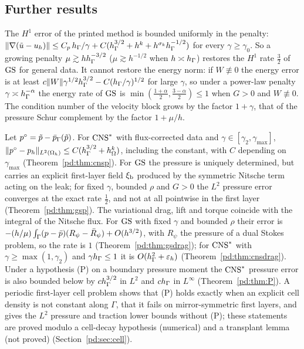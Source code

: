 \subsection*{Further results}
\begin{theoremR}
The $H^1$ error of the printed method is bounded uniformly in the penalty: $\lVert \nabla(\tilde u-u_h)\rVert\le C_p\,h_\Gamma/\gamma+C(h_\Gamma^{3/2}+h^k+h^{\sigma_k}h_\Gamma^{-1/2})$ for every $\gamma\ge\gamma_0$. So a growing penalty $\mu\gtrsim hh_\Gamma^{-3/2}$ ($\mu\gtrsim h^{-1/2}$ when $h\asymp h_\Gamma$) restores the $H^1$ rate $\frac32$ of $\mathrm{GS}$ for general data. It cannot restore the energy norm: if $W\not\equiv0$ the energy error is at least $c\lVert W\rVert\gamma^{1/2}h_\Gamma^{3/2}-C(h_\Gamma/\gamma)^{1/2}$ for large $\gamma$, so under a power-law penalty $\gamma\asymp h_\Gamma^{-\alpha}$ the energy rate of $\mathrm{GS}$ is $\min(\frac{1+\alpha}2,\frac{3-\alpha}2)\le1$ when $G>0$ and $W\not\equiv0$. The condition number of the velocity block grows by the factor $1+\gamma$, that of the pressure Schur complement by the factor $1+\mu/h$.
\end{theoremR}

\begin{theoremP}
Let $p^\circ=\tilde p-\bar p_{\Gamma}(\tilde p)$. For $\mathrm{CNS}^\ast$ with flux-corrected data and $\gamma\in[\gamma_2,\gamma_{\max}]$, $\lVert p^\circ-p_h\rVert_{L^2(\Omega_h)}\le C(h_\Gamma^{3/2}+h_\Omega^k)$, including the constant, with $C$ depending on $\gamma_{\max}$ (Theorem~\ref{pd:thm:cnsp}). For $\mathrm{GS}$ the pressure is uniquely determined, but carries an explicit first-layer field $\xi_{\mathrm b}$ produced by the symmetric Nitsche term acting on the leak; for fixed $\gamma$, bounded $\rho$ and $G>0$ the $L^2$ pressure error converges at the exact rate $\frac12$, and not at all pointwise in the first layer (Theorem~\ref{pd:thm:gsp}). The variational drag, lift and torque coincide with the integral of the Nitsche flux. For $\mathrm{GS}$ with fixed $\gamma$ and bounded $\rho$ their error is $-(h/\mu)\int_\Gamma(p-\bar p)(R_\psi-\bar R_\psi)+O(h^{3/2})$, with $R_\psi$ the pressure of a dual Stokes problem, so the rate is $1$ (Theorem~\ref{pd:thm:gsdrag}); for $\mathrm{CNS}^\ast$ with $\gamma\ge\max(1,\gamma_2)$ and $\gamma h_\Gamma\le1$ it is $O(h_\Gamma^2+\varepsilon_h)$ (Theorem~\ref{pd:thm:cnsdrag}). Under a hypothesis (P) on a boundary pressure moment the $\mathrm{CNS}^\ast$ pressure error is also bounded below by $ch_\Gamma^{3/2}$ in $L^2$ and $ch_\Gamma$ in $L^\infty$ (Theorem~\ref{pd:thm:P}). A periodic first-layer cell problem shows that (P) holds exactly when an explicit cell density is not constant along $\Gamma$, that it fails on mirror-symmetric first layers, and gives the $L^2$ pressure and traction lower bounds without (P); these statements are proved modulo a cell-decay hypothesis (numerical) and a transplant lemma (not proved) (Section~\ref{pd:sec:cell}).
\end{theoremP}

